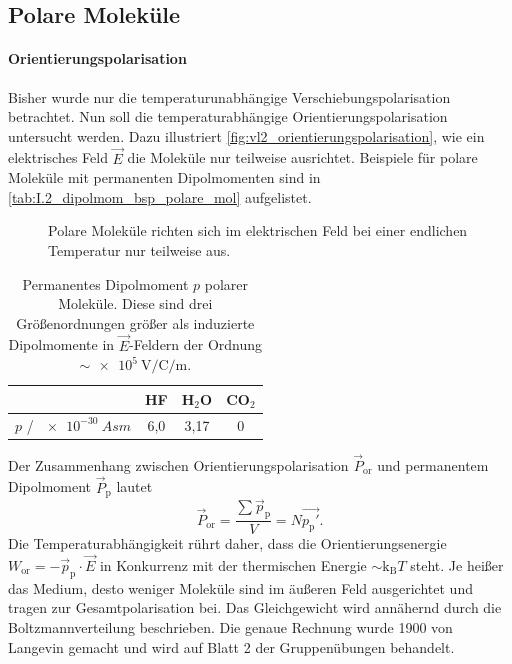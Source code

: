 \subsection{Polare Moleküle}
\paragraph{Orientierungspolarisation}
    Bisher wurde nur die temperaturunabhängige Verschiebungspolarisation betrachtet. Nun soll die temperaturabhängige Orientierungspolarisation untersucht werden. 
    Dazu illustriert \autoref{fig:vl2_orientierungspolarisation}, wie ein elektrisches Feld $\vec E$ die Moleküle nur teilweise ausrichtet. Beispiele für polare Moleküle mit permanenten Dipolmomenten sind in \autoref{tab:I.2_dipolmom_bsp_polare_mol} aufgelistet.
    \begin{figure}[H]
        \centering
        \caption{Polare Moleküle richten sich im elektrischen Feld bei einer endlichen Temperatur nur teilweise aus.}
        \label{fig:vl2_orientierungspolarisation}
    \end{figure}
    \vspace{-0.5cm}
    \begin{table}[H]
        \centering
        \caption{Permanentes Dipolmoment $p$ polarer Moleküle. Diese sind drei Größenordnungen größer als induzierte Dipolmomente in $\vec E$-Feldern der Ordnung $\sim\SI{e5}{\volt\per\coulomb\per\meter}$.}
        \begin{tabular}{|l||ccc|}\hline
             &HF&H${}_2$O&CO${}_2$  \\\hline
             $p$ / $\SI{e-30}{Asm}$&6,0&3,17&0 \\\hline
        \end{tabular}
        \label{tab:I.2_dipolmom_bsp_polare_mol}
    \end{table}
    Der Zusammenhang zwischen Orientierungspolarisation $\vec P_\text{or}$ und permanentem Dipolmoment $\vec P_\text{p}$ lautet
    $$
    \vec{P}_{\text{or}} = \frac{ \sum\vec{p}_{\text{p}}}{ V} = N \vec{p_\text{p}'}.
    $$ 
    Die Temperaturabhängigkeit rührt daher, dass die Orientierungsenergie $W_{\text{or}}= - \vec{p}_\text{p}\cdot\vec{E}$ in Konkurrenz mit der thermischen Energie $ \sim \mathrm{k}_{\mathrm{B}} T$ steht. Je heißer das Medium, desto weniger Moleküle sind im äußeren Feld ausgerichtet und tragen zur Gesamtpolarisation bei. Das Gleichgewicht wird annähernd durch die Boltzmannverteilung beschrieben. 
    Die genaue Rechnung wurde 1900 von Langevin gemacht und wird auf Blatt 2 der Gruppenübungen behandelt.\\
    
